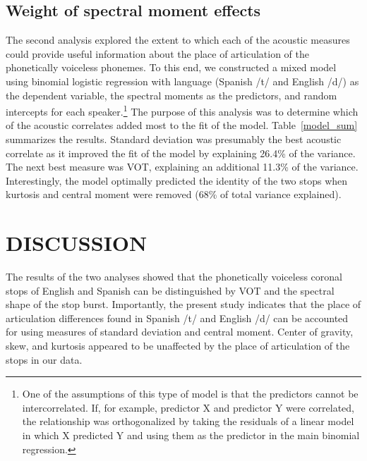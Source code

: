 \documentclass[a4paper,10pt,twocolumn]{article}\usepackage[]{graphicx}\usepackage[]{color}
\begin{document}
\subsection{Weight of spectral moment effects} %
\label{sub:hierarchical_model}

	The second analysis explored the extent to which each of the acoustic measures could provide useful information about the place of articulation of the phonetically voiceless phonemes. To this end, we constructed a mixed model using binomial logistic regression with language (Spanish /t/ and English /d/) as the dependent variable, the spectral moments as the predictors, and random intercepts for each speaker.\footnote{{\scriptsize{One of the assumptions of this type of model is that the predictors cannot be intercorrelated. If, for example, predictor X and predictor Y were correlated, the relationship was orthogonalized by taking the residuals of a linear model in which X predicted Y and using them as the predictor in the main binomial regression.}}} The purpose of this analysis was to determine which of the acoustic correlates added most to the fit of the model. Table~\ref{model_sum} summarizes the results. Standard deviation was presumably the best acoustic correlate as it improved the fit of the model by explaining 26.4\% of the variance. The next best measure was VOT, explaining an additional 11.3\% of the variance. Interestingly, the model optimally predicted the identity of the two stops when kurtosis and central moment were removed (68\% of total variance explained).

	\vspace{.1in}
	
	\vspace{.05in}



\section{DISCUSSION} %
\label{sec:discussion}

	The results of the two analyses showed that the phonetically voiceless coronal stops of English and Spanish can be distinguished by VOT and the spectral shape of the stop burst. Importantly, the present study indicates that the place of articulation differences found in Spanish /t/ and English /d/ can be accounted for using measures of standard deviation and central moment. Center of gravity, skew, and kurtosis appeared to be unaffected by the place of articulation of the stops in our data. 
\end{document}
